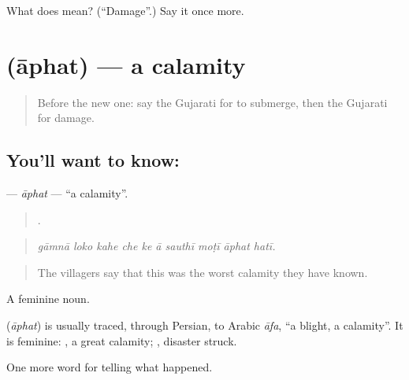 \begin{tcolorbox}[breakable,colback=teal!4,colframe=teal!35!black,title={Before you move on}]
What does  mean? (\textquotedblleft{}Damage\textquotedblright{}.) Say it once more.
\end{tcolorbox}
\section[\texorpdfstring{\gu{આફત} (āphat)}{આફત (āphat)}]{ (āphat) — a calamity}

\label{lesson:GU-C304-aphat}



\begin{quote}
Before the new one: say the Gujarati for to submerge, then the Gujarati for damage.
\end{quote}

\subsection*{You'll want to know: }
\textbf{} — \emph{āphat} — \textquotedblleft{}a calamity\textquotedblright{}.

\begin{quote}
         .
\end{quote}

\begin{quote}
\emph{gāmnā loko kahe che ke ā sauthī moṭī āphat hatī.}
\end{quote}

\begin{quote}
The villagers say that this was the worst calamity they have known.
\end{quote}

A feminine noun.

\begin{cousinweb}
\textbf{} (\emph{āphat}) is usually traced, through Persian, to Arabic \emph{āfa}, \textquotedblleft{}a blight, a calamity\textquotedblright{}. It is feminine: \textbf{ }, a great calamity; \textbf{ }, disaster struck.
\end{cousinweb}

\begin{grammarlens}[title={What you've built}]
One more word for telling what happened.
\end{grammarlens}

